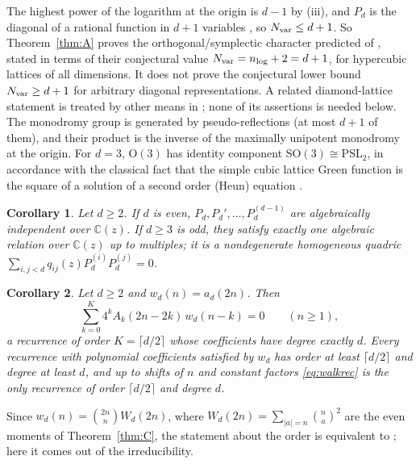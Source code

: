 \documentclass[11pt]{amsart}
\newtheorem{corA}{Corollary}
\theoremstyle{definition}
\newcommand{\C}{\mathbb C}
\newcommand{\SO}{\mathrm{SO}}
\newcommand{\Ort}{\mathrm{O}}
\begin{document}
The highest power of the logarithm at the origin is $d-1$ by (iii), and $P_d$ is the diagonal of a rational function in $d+1$ variables \cite{HMZ25}, so $N_{\rm var}\le d+1$. So Theorem~\ref{thm:A} proves the orthogonal/symplectic character predicted of \cite{HMZ25}, stated in terms of their conjectural value $N_{\rm var}=n_{\log}+2=d+1$, for hypercubic lattices of all dimensions. It does not prove the conjectural lower bound $N_{\rm var}\ge d+1$ for arbitrary diagonal representations. A related diamond-lattice statement is treated by other means in \cite[Cor.~E]{KBan2}; none of its assertions is needed below. The monodromy group is generated by pseudo-reflections (at most $d+1$ of them), and their product is the inverse of the maximally unipotent monodromy at the origin. For $d=3$, $\Ort(3)$ has identity component $\SO(3)\cong\mathrm{PSL}_2$, in accordance with the classical fact that the simple cubic lattice Green function is the square of a solution of a second order (Heun) equation \cite[\S7.2]{HMZ25}.

\begin{corA}\label{cor:A1}
Let $d\ge2$. If $d$ is even, $P_d,P_d',\dots,P_d^{(d-1)}$ are algebraically independent over $\C(z)$. If $d\ge3$ is odd, they satisfy exactly one algebraic relation over $\C(z)$ up to multiples; it is a nondegenerate homogeneous quadric $\sum_{i,j<d}q_{ij}(z)P_d^{(i)}P_d^{(j)}=0$.
\end{corA}

\begin{corA}\label{cor:A2}
Let $d\ge2$ and $w_d(n)=a_d(2n)$. Then
\begin{equation}\label{eq:walkrec}
\sum_{k=0}^{K}4^kA_k(2n-2k)\,w_d(n-k)=0\qquad(n\ge1),
\end{equation}
a recurrence of order $K=\lceil d/2\rceil$ whose coefficients have degree exactly $d$. Every recurrence with polynomial coefficients satisfied by $w_d$ has order at least $\lceil d/2\rceil$ and degree at least $d$, and up to shifts of $n$ and constant factors \eqref{eq:walkrec} is the only recurrence of order $\lceil d/2\rceil$ and degree $d$.
\end{corA}

Since $w_d(n)=\binom{2n}nW_d(2n)$, where $W_d(2n)=\sum_{|a|=n}\binom n{a}^2$ are the even moments of Theorem~\ref{thm:C}, the statement about the order is equivalent to \cite[Thm.~1.7(c)]{KVB}; here it comes out of the irreducibility.
\end{document}
